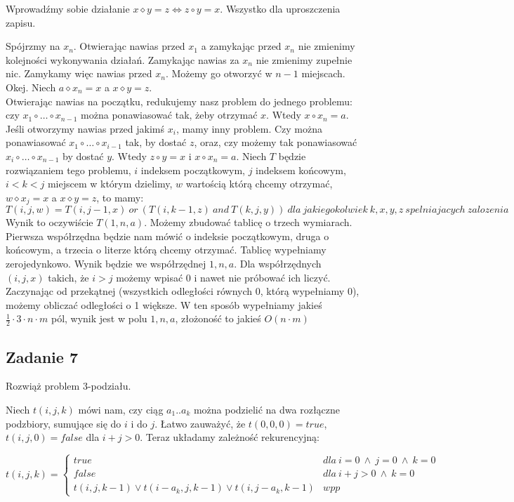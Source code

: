 \documentclass[a4paper]{article}
\begin{document}
Wprowadźmy sobie działanie $x\diamond y=z \Leftrightarrow z\circ y = x$. Wszystko dla uproszczenia zapisu.

Spójrzmy na $x_n$. Otwierając nawias przed $x_1$ a zamykając przed $x_n$ nie zmienimy kolejności wykonywania działań. Zamykając nawias za $x_n$ nie zmienimy zupełnie nic. Zamykamy więc nawias przed $x_n$. Możemy go otworzyć w $n-1$ miejscach. Okej. Niech  $a \diamond x_n = x$ a $x \diamond y = z$.\\
Otwierając nawias na początku, redukujemy nasz problem do jednego problemu: czy $x_1\circ \dots \circ x_{n-1}$ można ponawiasować tak, żeby otrzymać $x$. Wtedy $x\circ x_n = a$.\\
Jeśli otworzymy nawias przed jakimś $x_i$, mamy inny problem. Czy można ponawiasować $x_1\circ \dots \circ x_{i-1}$ tak, by dostać $z$, oraz, czy możemy tak ponawiasować $x_i\circ \dots \circ x_{n-1}$ by dostać $y$. Wtedy $z\circ y = x$ i $x\circ x_n = a$.
Niech $T$ będzie rozwiązaniem tego problemu, $i$ indeksem początkowym, $j$ indeksem końcowym,$i<k<j$ miejscem w którym dzielimy, $w$ wartością którą chcemy otrzymać, $w \diamond x_j = x$ a $x \diamond y = z$, to mamy:
$$T(i,j,w)=T(i,j-1,x)\ or\ ( T(i,k-1,z)\ and\ T(k,j,y))\ dla\ jakiegokolwiek\ k,x,y,z\ spelniajacych\ zalozenia$$
Wynik to oczywiście $T(1,n,a)$. Możemy zbudować tablicę o trzech wymiarach. Pierwsza współrzędna będzie nam mówić o indeksie początkowym, druga o końcowym, a trzecia o literze którą chcemy otrzymać. Tablicę wypełniamy zerojedynkowo. Wynik będzie we współrzędnej $1,n,a$. Dla współrzędnych $(i,j,x)$ takich, że $i>j$ możemy wpisać 0 i nawet nie próbować ich liczyć. Zaczynając od przekątnej (wszystkich odległości równych 0, którą wypełniamy 0), możemy obliczać odległości o 1 większe. W ten sposób wypełniamy jakieś $\frac{1}{2}\cdot 3\cdot n\cdot m$ pól, wynik jest w polu $1,n,a$, złożoność to jakieś $O(n\cdot m)$ 

\subsection*{Zadanie 7}
Rozwiąż problem 3-podziału.

Niech $t(i,j,k)$ mówi nam, czy ciąg $a_1..a_k$ można podzielić na dwa rozłączne podzbiory, sumujące się do $i$ i do $j$. Łatwo zauważyć, że $t(0,0,0)=true$, $t(i,j,0) = false$ dla $i+j>0$. Teraz układamy zależność rekurencyjną:

$$t(i,j,k) = \left\{\begin{matrix}
true & dla\ i=0\ \wedge \ j=0 \ \wedge \ k=0  \\
false & dla\ i+j>0\ \wedge \ k=0  \\ 
t(i,j,k-1)\vee t(i-a_k, j, k-1) \vee t(i,j-a_k, k-1) & wpp 
\end{matrix}\right.$$
\end{document}
